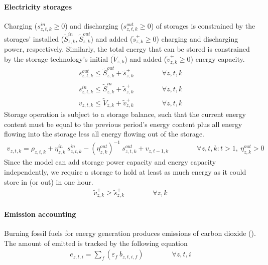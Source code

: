 \documentclass[11pt,a4paper]{article}
\begin{document}
\paragraph{Electricity storages}
Charging ($s^{in}_{z,t,k} \geq 0$) and discharging ($s^{out}_{z,t,k} \geq 0$) of storages is constrained by the storages' installed ($\widetilde{S}^{in}_{z,k}, \widetilde{S}^{out}_{z,k}$) and added ($\widetilde{s}^{+}_{z,k} \geq 0$) charging and discharging power, respectively. Similarly, the total energy that can be stored is constrained by the storage technology's initial ($\widetilde{V}_{z,k}$) and added ($\widetilde{v}^{+}_{z,k} \geq 0$) energy capacity.
\begin{align}
s^{out}_{z,t,k} \leq \widetilde{S}^{out}_{z,k} + \widetilde{s}^{+}_{z,k} \qquad \qquad \forall z,t,k \\
s^{in}_{z,t,k} \leq \widetilde{S}^{in}_{z,k} + \widetilde{s}^{+}_{z,k} \qquad \qquad \forall z,t,k \\
v_{z,t,k} \leq \widetilde{V}_{z,k} + \widetilde{v}^{+}_{z,k} \qquad \qquad \forall z,t,k
\end{align}
Storage operation is subject to a storage balance, such that the current energy content must be equal to the previous period's energy content plus all energy flowing into the storage less all energy flowing out of the storage.
\begin{align}
v_{z,t,k} = \rho_{z,t,k} + \eta^{in}_{z,k} \: s^{in}_{z,t,k} - (\eta^{out}_{z,k})^{-1} \: s^{out}_{z,t,k} + v_{z,t-1,k} \qquad \qquad \forall z,t,k: t>1, \: \eta^{out}_{z,k} > 0
\end{align}
Since the model can add storage power capacity and energy capacity independently, we require a storage to hold at least as much energy as it could store in (or out) in one hour.
\begin{align}
\widetilde{v}^{+}_{z,k} \geq \widetilde{s}^{+}_{z,k} \qquad \qquad \forall z,k
\end{align}

\paragraph{Emission accounting}
Burning fossil fuels for energy generation produces emissions of carbon dioxide (). The amount of  emitted is tracked by the following equation
\begin{align}
e_{z,t,i} = \sum_{f} \left( \varepsilon_{f} \: b_{z,t,i,f} \right) \qquad \qquad \forall z,t,i
\end{align}
\end{document}
